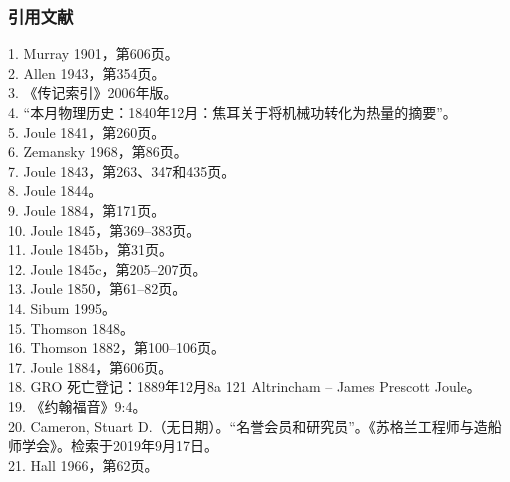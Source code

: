 \subsubsection{引用文献}
1. Murray 1901，第606页。\\
2. Allen 1943，第354页。\\ 
3. 《传记索引》2006年版。\\  
4. “本月物理历史：1840年12月：焦耳关于将机械功转化为热量的摘要”。\\  
5. Joule 1841，第260页。\\
6. Zemansky 1968，第86页。\\
7. Joule 1843，第263、347和435页。\\
8. Joule 1844。\\
9. Joule 1884，第171页。\\
10. Joule 1845，第369–383页。\\
11. Joule 1845b，第31页。\\ 
12. Joule 1845c，第205–207页。\\ 
13. Joule 1850，第61–82页。\\
14. Sibum 1995。\\
15. Thomson 1848。\\
16. Thomson 1882，第100–106页。\\
17. Joule 1884，第606页。\\
18. GRO 死亡登记：1889年12月8a 121 Altrincham – James Prescott Joule。\\
19. 《约翰福音》9:4。\\
20. Cameron, Stuart D.（无日期）。“名誉会员和研究员”。《苏格兰工程师与造船师学会》。检索于2019年9月17日。\\
21. Hall 1966，第62页。\\
